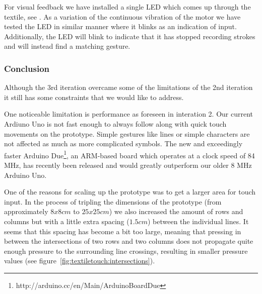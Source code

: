 For visual feedback we have installed a single LED which comes up through the textile, see .
As a variation of the continuous vibration of the motor we have tested the LED in similar manner where it blinks as an indication of input.
Additionally, the LED will blink to indicate that it has stopped recording strokes and will instead find a matching gesture.


\subsubsection{Conclusion} 

Although the 3rd iteration overcame some of the limitations of the 2nd iteration it still has some constraints that we would like to address.

One noticeable limitation is performance as foreseen in interation 2.
Our current Ardiuno Uno is not fast enough to always follow along with quick touch movements on the prototype.
Simple gestures like lines or simple characters are not affected as much as more complicated symbols.
The new and exceedingly faster Arduino Due\footnote{http://arduino.cc/en/Main/ArduinoBoardDue}, an ARM-based board which operates at a clock speed of 84 MHz, has recently been released and would greatly outperform our older 8 MHz Arduino Uno.

One of the reasons for scaling up the prototype was to get a larger area for touch input.
In the process of tripling the dimensions of the prototype (from approximately \(8x8cm\) to \(25x25cm\)) we also increased the amount of rows and columns but with a little extra spacing (\(1.5cm\)) between the individual lines.
It seems that this spacing has become a bit too large, meaning that pressing in between the intersections of two rows and two columns does not propagate quite enough pressure to the surrounding line crossings, resulting in smaller pressure values (see figure~\ref{fig:textiletouch:intersections}).

